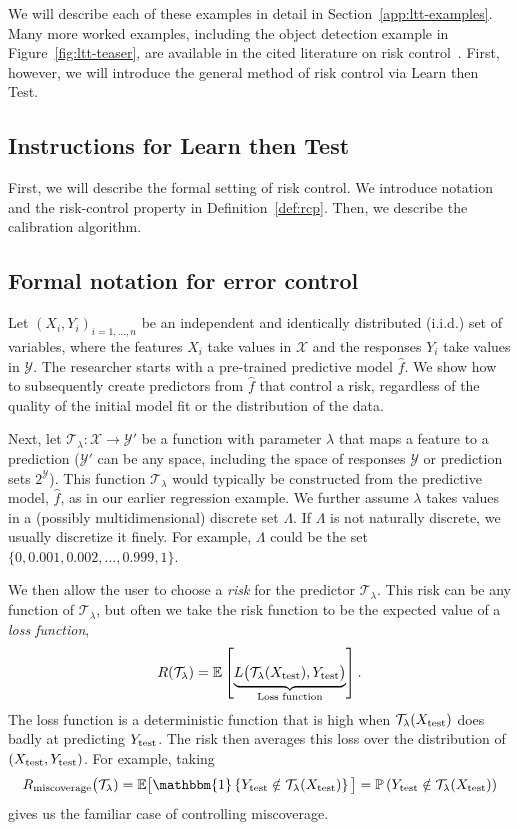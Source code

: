 \documentclass[10pt]{article}
\def\E{\mathbb{E}}
\newcommand{\Y}{\mathcal{Y}}
\newcommand{\X}{\mathcal{X}}
\newcommand{\T}{\mathcal{T}}
\newcommand{\ind}[1]{\mathbbm{1}\left\{#1\right\}}
\renewcommand{\P}{\mathbb{P}}
\begin{document}
We will describe each of these examples in detail in Section~\ref{app:ltt-examples}.
Many more worked examples, including the object detection example in Figure~\ref{fig:ltt-teaser}, are available in the cited literature on risk control~\cite{bates2021distribution,angelopoulos2021learn}.
First, however, we will introduce the general method of risk control via Learn then Test.

\subsection{Instructions for Learn then Test}
\label{app:ltt-methods}
First, we will describe the formal setting of risk control. 
We introduce notation and the risk-control property in Definition~\ref{def:rcp}. Then, we describe the calibration algorithm.

\subsection*{Formal notation for error control}

Let $(X_i, Y_i)_{i = 1,\dots,n}$ be an independent and identically distributed (i.i.d.) set of variables, where the features $X_i$ take values in $\X$ and the responses $Y_i$ take values in $\Y$.  
The researcher starts with a pre-trained predictive model $\hat{f}$.
We show how to subsequently create predictors from $\hat{f}$ that control a risk, regardless of the quality of the initial model fit or the distribution of the data. 

Next, let $\T_\lambda : \X \to \Y'$ be a function with parameter $\lambda$ that maps a feature to a prediction ($\Y'$ can be any space, including the space of responses $\Y$ or prediction sets $2^{\Y}$). 
This function $\T_{\lambda}$ would typically be constructed from the predictive model, $\hat{f}$, as in our earlier regression example.
We further assume $\lambda$ takes values in a (possibly multidimensional) discrete set $\Lambda$.
If $\Lambda$ is not naturally discrete, we usually discretize it finely.
For example, $\Lambda$ could be the set $\{0, 0.001, 0.002, ..., 0.999, 1\}$.

We then allow the user to choose a {\em risk} for the predictor $\T_{\lambda}$.
This risk can be any function of $\T_{\lambda}$, but often we take the risk function to be the expected value of a \emph{loss function},
\begin{equation}
    \label{eq:risk-expectation-loss}
    R(\T_{\lambda}) =  \E\left[\underbrace{L\big(\T_{\lambda}(X_{\rm test}),Y_{\rm test}\big)}_{\text{Loss function}}\right].
\end{equation}
The loss function is a deterministic function that is high when $\T_{\lambda}(X_{\rm test})$ does badly at predicting $Y_{\rm test}$.
The risk then averages this loss over the distribution of $(X_{\rm test},Y_{\rm test})$.
For example, taking 
\begin{equation*}
R_{\text{miscoverage}}\big(\T_{\lambda}) = \E\big[\ind{ Y_{\rm test} \notin \T_{\lambda}(X_{\rm test})}\big] = \P\left(Y_{\rm test} \notin \T_{\lambda}(X_{\rm test})\right)
\end{equation*}
gives us the familiar case of controlling miscoverage.
\end{document}
